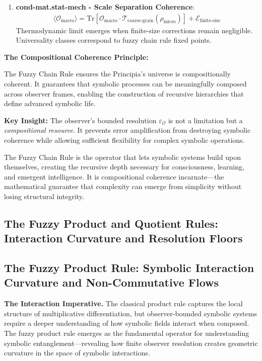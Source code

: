 \begin{scholium}
\begin{enumerate}
\item \textbf{cond-mat.stat-mech - Scale Separation Coherence}:
   \begin{align}
   \langle \mathcal{O}_{\text{macro}} \rangle = \text{Tr}[\mathcal{O}_{\text{macro}} \cdot \mathcal{T}_{\text{coarse-grain}}(\rho_{\text{micro}})] + \mathcal{E}_{\text{finite-size}}
   \end{align}
   Thermodynamic limit emerges when finite-size corrections remain negligible. Universality classes correspond to fuzzy chain rule fixed points.
\end{enumerate}
\end{scholium}

\textbf{The Compositional Coherence Principle:}

The Fuzzy Chain Rule ensures the Principia's universe is compositionally coherent. It guarantees that symbolic processes can be meaningfully composed across observer frames, enabling the construction of recursive hierarchies that define advanced symbolic life.

\textbf{Key Insight:} The observer's bounded resolution $\varepsilon_{\mathcal{O}}$ is not a limitation but a \textit{compositional resource}. It prevents error amplification from destroying symbolic coherence while allowing sufficient flexibility for complex symbolic operations.

The Fuzzy Chain Rule is the operator that lets symbolic systems build upon themselves, creating the recursive depth necessary for consciousness, learning, and emergent intelligence. It is compositional coherence incarnate---the mathematical guarantee that complexity can emerge from simplicity without losing structural integrity.

\subsection{The Fuzzy Product and Quotient Rules: Interaction Curvature and Resolution Floors}
\label{subsec:bk4_fuzzy_product_quotient}

\subsection[The Fuzzy Product Rule: Symbolic Interaction Curvature]{The Fuzzy Product Rule: Symbolic Interaction Curvature and Non-Commutative Flows}
\label{subsec:bk4_fuzzy_product_rule}

\textbf{The Interaction Imperative.} The classical product rule captures the local structure of multiplicative differentiation, but observer-bounded symbolic systems require a deeper understanding of how symbolic fields interact when composed. The fuzzy product rule emerges as the fundamental operator for understanding symbolic entanglement---revealing how finite observer resolution creates geometric curvature in the space of symbolic interactions.

